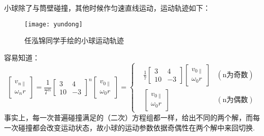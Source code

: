 \documentclass{ctexart}
\begin{document}
    小球除了与筒壁碰撞，其他时候作匀速直线运动，运动轨迹如下：\par
    \begin{figure}[htbp]
        \centering
        \texttt{[image: yundong]}
        \caption*{任泓锦同学手绘的小球运动轨迹}
        \label{yundong}
    \end{figure}
    容易知道：
    \begin{equation}
        \begin{bmatrix}
            v_{n\parallel} \\
            \omega_nr
        \end{bmatrix}
        =\frac{1}{7^n}
        \begin{bmatrix}
            3 & 4 \\
            10 & -3 
        \end{bmatrix}^n
        \begin{bmatrix}
            v_{0\parallel} \\
            \omega_0r
        \end{bmatrix}
        =
        \left\{
            \begin{aligned}
                &\frac{1}{7}
                \begin{bmatrix}
                    3 & 4 \\
                    10 & -3 
                \end{bmatrix}
                \begin{bmatrix}
                    v_{0\parallel} \\
                    \omega_0r
                \end{bmatrix}&(\text{n为奇数}) \\
                &\begin{bmatrix}
                    v_{0\parallel} \\
                    \omega_0r
                \end{bmatrix}&(\text{n为偶数})
            \end{aligned}
        \right . \tag{5.3}
    \end{equation}
事实上，每一次普遍碰撞满足的（二次）方程组都一样，给出不同的两个解，而每一次碰撞都会改变运动状态，故小球的运动参数依据奇偶性在两个解中来回切换.
\end{document}
